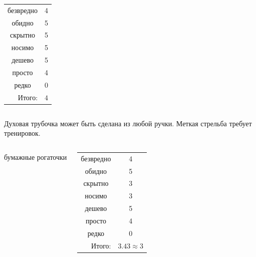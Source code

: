 \begin{frame}
\begin{columns}
            \begin{center}
                \begin{tabular}{c|c}
                    \hline
                    безвредно                   & 4 \\
                    обидно                      & 5 \\
                    скрытно                     & 5 \\
                    носимо                      & 5 \\
                    дешево                      & 5 \\
                    просто                      & 4 \\ 
                    редко                       & 0 \\ \hline
                    \multicolumn{1}{r|}{Итого:} & $4$ \\
                \end{tabular}
            \end{center}
    \end{columns}    
\end{frame}

Духовая трубочка может быть сделана из любой ручки. Меткая стрельба требует тренировок.


\begin{frame} %
    \begin{columns}
            бумажные рогаточки
            
            \begin{center}
                \begin{tabular}{c|c}
                    \hline
                    безвредно                   & 4 \\
                    обидно                      & 5 \\
                    скрытно                     & 3 \\
                    носимо                      & 3 \\
                    дешево                      & 5 \\
                    просто                      & 4 \\ 
                    редко                       & 0 \\ \hline
                    \multicolumn{1}{r|}{Итого:} & $3.43\approx 3$ \\
                \end{tabular}
            \end{center}
    \end{columns}    
\end{frame}



